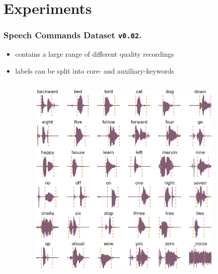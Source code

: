 
\section{Experiments}

\begin{frame}
  \frametitle{Speech Commands Dataset \texttt{v0.02}.}
  \begin{itemize}
    \item contains a large range of different quality recordings
    \item labels can be split into core- and auxiliary-keywords
  \end{itemize}
  \vspace{-0.5cm}
  \begin{columns}
    \begin{column}{0.55\textwidth}
    \centering
    
    \end{column}
    \begin{column}{0.45\textwidth}
      \centering
      \begin{figure} \includegraphics[width=0.9\textwidth]{../5_exp/figs/exp_dataset_speech_cmd_wav_grid.png} \end{figure}
    \end{column}
  \end{columns}
\end{frame}

